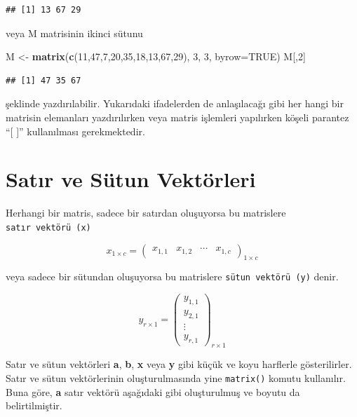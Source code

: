 \documentclass[
]{book}
\newenvironment{Shaded}{\begin{snugshade}}{\end{snugshade}}
\newcommand{\AttributeTok}[1]{\textcolor[rgb]{0.13,0.29,0.53}{#1}}
\newcommand{\ConstantTok}[1]{\textcolor[rgb]{0.56,0.35,0.01}{#1}}
\newcommand{\DecValTok}[1]{\textcolor[rgb]{0.00,0.00,0.81}{#1}}
\newcommand{\FunctionTok}[1]{\textcolor[rgb]{0.13,0.29,0.53}{\textbf{#1}}}
\newcommand{\NormalTok}[1]{#1}
\newcommand{\OtherTok}[1]{\textcolor[rgb]{0.56,0.35,0.01}{#1}}
\begin{document}
\begin{verbatim}
## [1] 13 67 29
\end{verbatim}

veya M matrisinin ikinci sütunu

\begin{Shaded}
\begin{Highlighting}[]
\NormalTok{M }\OtherTok{\textless{}{-}} \FunctionTok{matrix}\NormalTok{(}\FunctionTok{c}\NormalTok{(}\DecValTok{11}\NormalTok{,}\DecValTok{47}\NormalTok{,}\DecValTok{7}\NormalTok{,}\DecValTok{20}\NormalTok{,}\DecValTok{35}\NormalTok{,}\DecValTok{18}\NormalTok{,}\DecValTok{13}\NormalTok{,}\DecValTok{67}\NormalTok{,}\DecValTok{29}\NormalTok{), }\DecValTok{3}\NormalTok{, }\DecValTok{3}\NormalTok{, }\AttributeTok{byrow=}\ConstantTok{TRUE}\NormalTok{) }
\NormalTok{M[,}\DecValTok{2}\NormalTok{]}
\end{Highlighting}
\end{Shaded}

\begin{verbatim}
## [1] 47 35 67
\end{verbatim}

şeklinde yazdırılabilir. Yukarıdaki ifadelerden de anlaşılacağı gibi her hangi bir matrisin elemanları yazdırılırken veya matris işlemleri yapılırken köşeli parantez ``{[} {]}'' kullanılması gerekmektedir.

\section{Satır ve Sütun Vektörleri}\label{satux131r-ve-suxfctun-vektuxf6rleri}

Herhangi bir matris, sadece bir satırdan oluşuyorsa bu matrislere \texttt{satır\ vektörü\ (x)}

\[x_{1×c} =
\begin{pmatrix}
 x_{1,1} & x_{1,2} & \cdots & x_{1,c}
\end{pmatrix}_{1 × c}\]

veya sadece bir sütundan oluşuyorsa bu matrislere \texttt{sütun\ vektörü\ (y)} denir.

\[y_{r×1} =
\begin{pmatrix}
 y_{1,1} \\ 
 y_{2,1} \\
 \vdots \\
 y_{r,1}
\end{pmatrix}_{r×1}\]

Satır ve sütun vektörleri \textbf{a}, \textbf{b}, \textbf{x} veya \textbf{y} gibi küçük ve koyu harflerle gösterilirler. Satır ve sütun vektörlerinin oluşturulmasında yine \texttt{matrix()} komutu kullanılır. Buna göre, \textbf{a} satır vektörü aşağıdaki gibi oluşturulmuş ve boyutu da belirtilmiştir.
\end{document}

